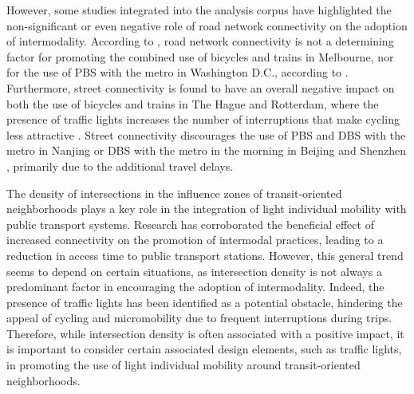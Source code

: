 \begin{refsegment}
However, some studies integrated into the analysis corpus have highlighted the non-significant or even negative role of road network connectivity on the adoption of intermodality. According to \textcolor{blue}{\textcite[403]{weliwitiya_bicycle_2019}}, road network connectivity is not a determining factor for promoting the combined use of bicycles and trains in Melbourne, nor for the use of \acrshort{PBS} with the metro in Washington D.C., according to \textcolor{blue}{\textcite[8]{ma_bicycle_2015}}. Furthermore, street connectivity is found to have an overall negative impact on both the use of bicycles and trains in The Hague and Rotterdam, where the presence of traffic lights increases the number of interruptions that make cycling less attractive \textcolor{blue}{\autocite[493]{la_paix_puello_role_2021}}. Street connectivity discourages the use of \acrshort{PBS} and \acrshort{DBS} with the metro in Nanjing \textcolor{blue}{\autocite[8]{cheng_comparison_2023}} or \acrshort{DBS} with the metro in the morning in Beijing \textcolor{blue}{\autocite[16]{ni_exploring_2020}} and Shenzhen \textcolor{blue}{\autocite[13]{guo_built_2020}}, primarily due to the additional travel delays.%

The density of intersections in the influence zones of transit-oriented neighborhoods plays a key role in the integration of light individual mobility with public transport systems. Research has corroborated the beneficial effect of increased connectivity on the promotion of intermodal practices, leading to a reduction in access time to public transport stations. However, this general trend seems to depend on certain situations, as intersection density is not always a predominant factor in encouraging the adoption of intermodality. Indeed, the presence of traffic lights has been identified as a potential obstacle, hindering the appeal of cycling and micromobility due to frequent interruptions during trips. Therefore, while intersection density is often associated with a positive impact, it is important to consider certain associated design elements, such as traffic lights, in promoting the use of light individual mobility around transit-oriented neighborhoods.%


\end{refsegment}
